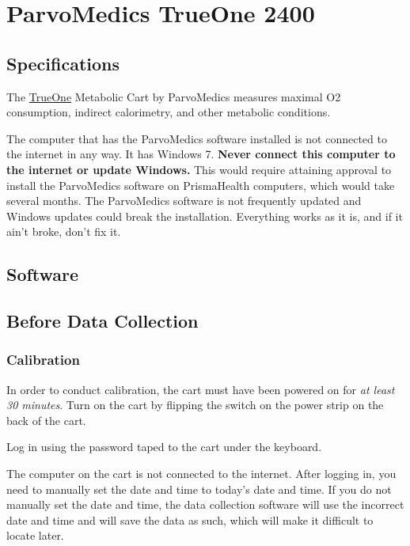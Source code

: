\documentclass[
]{book}
\begin{document}
\hypertarget{Parvo}{%
\chapter{ParvoMedics TrueOne 2400}\label{Parvo}}

\hypertarget{Parvo-Specs}{%
\section{Specifications}\label{Parvo-Specs}}

The \href{http://www.parvo.com/}{TrueOne} Metabolic Cart by ParvoMedics measures maximal O2 consumption, indirect calorimetry, and other metabolic conditions.

The computer that has the ParvoMedics software installed is not connected to the internet in any way. It has Windows 7. \textbf{Never connect this computer to the internet or update Windows.} This would require attaining approval to install the ParvoMedics software on PrismaHealth computers, which would take several months. The ParvoMedics software is not frequently updated and Windows updates could break the installation. Everything works as it is, and if it ain't broke, don't fix it.

\hypertarget{Parvo-Software}{%
\section{Software}\label{Parvo-Software}}

\hypertarget{Parvo-BeforeDataCollection}{%
\section{Before Data Collection}\label{Parvo-BeforeDataCollection}}

\hypertarget{Parvo-Calibration}{%
\subsection{Calibration}\label{Parvo-Calibration}}

In order to conduct calibration, the cart must have been powered on for \emph{at least 30 minutes}.
Turn on the cart by flipping the switch on the power strip on the back of the cart.

Log in using the password taped to the cart under the keyboard.

The computer on the cart is not connected to the internet. After logging in, you need to manually set the date and time to today's date and time. If you do not manually set the date and time, the data collection software will use the incorrect date and time and will save the data as such, which will make it difficult to locate later.
\end{document}
